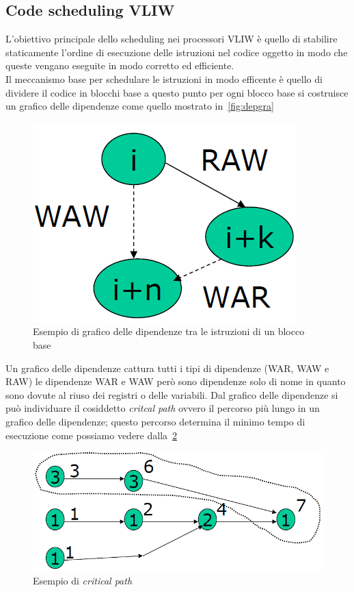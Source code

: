 \subsection{Code scheduling VLIW}
L'obiettivo principale dello scheduling nei processori VLIW è quello di stabilire staticamente l'ordine di esecuzione delle istruzioni nel codice oggetto in modo che queste vengano eseguite in modo corretto ed efficiente.\\
Il meccanismo base per schedulare le istruzioni in modo efficente è quello di dividere il codice in blocchi base a questo punto per ogni blocco base si costruisce un grafico delle dipendenze come quello mostrato in \figurename\,\ref{fig:depgra}
\begin{figure}[htb]
\centering
\includegraphics[scale=0.5]{img/depgrap.png}
\caption{Esempio di grafico delle dipendenze tra le istruzioni di un blocco base}\label{fig:depgrap}
\end{figure}
Un grafico delle dipendenze cattura tutti i tipi di dipendenze (WAR, WAW e RAW) le dipendenze WAR e WAW però sono dipendenze solo di nome in quanto sono dovute al riuso dei registri o delle variabili. Dal grafico delle dipendenze si può individuare il cosiddetto \emph{critcal path} ovvero il percorso più lungo in un grafico delle dipendenze; questo percorso determina il minimo tempo di esecuzione come possiamo vedere dalla \figurename\,\ref{fig:criticalpath}
\begin{figure}[htb]
\centering
\includegraphics[scale=0.5]{img/criticalpath.png}
\caption{Esempio di \emph{critical path}}\label{fig:criticalpath}
\end{figure}

